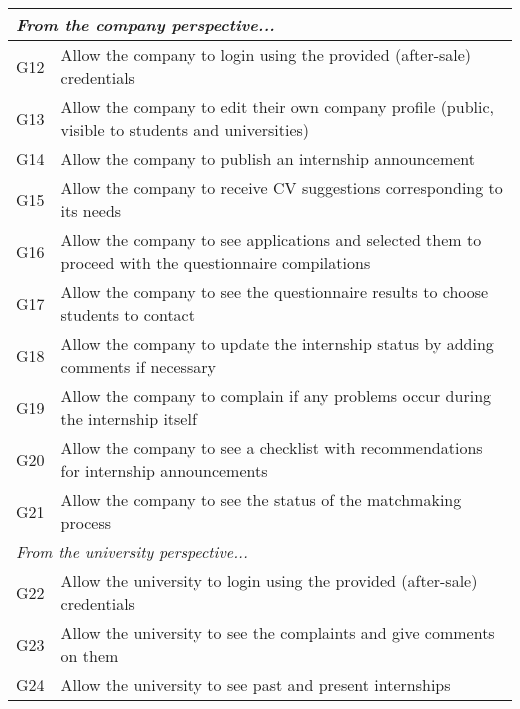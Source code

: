 \begin{table}[H]
\begin{tabular}{|l|p{}|}
        \hline
        \multicolumn{2}{|l|}{\textit{From the company perspective...}}                                                               \\
        \hline
        G12           & Allow the company to login using the provided (after-sale) credentials                                       \\
        \hline
        G13           & Allow the company to edit their own company profile (public, visible to students and universities)           \\
        \hline
        G14           & Allow the company to publish an internship announcement                                                      \\
        \hline
        G15           & Allow the company to receive CV suggestions corresponding to its needs                                       \\
        \hline
        G16           & Allow the company to see applications and selected them to proceed with the questionnaire compilations       \\
        \hline
        G17           & Allow the company to see the questionnaire results to choose students to contact                             \\
        \hline
        G18           & Allow the company to update the internship status by adding comments if necessary                            \\
        \hline
        G19           & Allow the company to complain if any problems occur during the internship itself                             \\
        \hline
        G20           & Allow the company to see a checklist with recommendations for internship announcements                       \\
        \hline
        G21           & Allow the company to see the status of the matchmaking process                                               \\
        \hline
        \multicolumn{2}{|l|}{\textit{From the university perspective...}}                                                            \\
        \hline
        G22           & Allow the university to login using the provided (after-sale) credentials                                    \\
        \hline
        G23           & Allow the university to see the complaints and give comments on them                                         \\
        \hline
        G24           & Allow the university to see past and present internships                                                     \\
        \hline
    \end{tabular}
\end{table}

